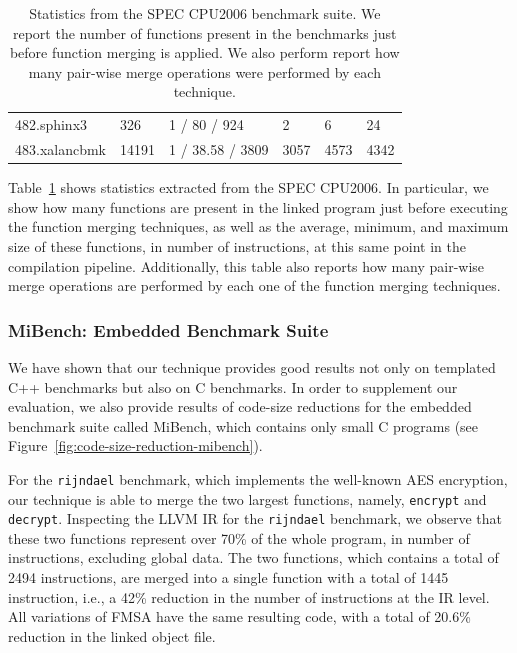 \begin{table}[h]
{\begin{tabular}{llllll}
\rowcolor{evencolor} 482.sphinx3        & 326    & 1 / 80 / 924       & 2      & 6     & 24     \\
                     483.xalancbmk      & 14191  & 1 / 38.58 / 3809   & 3057   & 4573  & 4342   \\
\bottomrule
\end{tabular}
}
\caption{
Statistics from the SPEC CPU2006 benchmark suite.
We report the number of functions present in the benchmarks just before function merging is applied. We also perform report how many pair-wise merge operations were performed by
each technique.
}
\label{tab:stats}
\end{table}

Table~\ref{tab:stats} shows statistics extracted from the SPEC CPU2006.
In particular, we show how many functions are present in the linked program
just before executing the function merging techniques, as well as
the average, minimum, and maximum size of these functions, in number of instructions, at
this same point in the compilation pipeline.
Additionally, this table also reports how many pair-wise merge operations are
performed by each one of the function merging techniques.

\subsubsection*{MiBench: Embedded Benchmark Suite}

We have shown that our technique provides good results not only on templated C++
benchmarks but also on C benchmarks.
In order to supplement our evaluation, we also provide results of code-size
reductions for the embedded benchmark suite called MiBench, which contains only
small C programs (see Figure~\ref{fig:code-size-reduction-mibench}).

For the \texttt{rijndael} benchmark, which implements the well-known AES
encryption, our technique is able to merge the two largest functions, namely,
\texttt{encrypt} and \texttt{decrypt}.
Inspecting the LLVM IR for the \texttt{rijndael} benchmark, we observe that
these two functions represent over 70\% of the whole program, in number of
instructions, excluding global data.
The two functions, which contains a total of 2494 instructions, are merged into
a single function with a total of 1445 instruction, i.e., a 42\% reduction in
the number of instructions at the IR level. All variations of FMSA have the same
resulting code, with a total of 20.6\% reduction in the linked object file.

